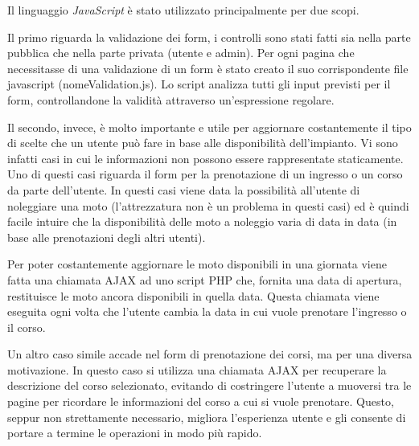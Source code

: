 Il linguaggio \textit{JavaScript} è stato utilizzato principalmente per due scopi.

Il primo riguarda la validazione dei form, i controlli sono stati fatti sia nella parte pubblica che nella parte privata (utente e admin). Per ogni pagina che necessitasse di una validazione di un form è stato creato il suo corrispondente file javascript (nomeValidation.js). Lo script analizza tutti gli input previsti per il form, controllandone la validità attraverso un'espressione regolare.
    
Il secondo, invece, è molto importante e utile per aggiornare costantemente il tipo di scelte che un utente può fare in base alle disponibilità dell'impianto. Vi sono infatti casi in cui le informazioni non possono essere rappresentate staticamente. Uno di questi casi riguarda il form per la prenotazione di un ingresso o un corso da parte dell'utente. In questi casi viene data la possibilità all'utente di noleggiare una moto (l'attrezzatura non è un problema in questi casi) ed è quindi facile intuire che la disponibilità delle moto a noleggio varia di data in data (in base alle prenotazioni degli altri utenti).

Per poter costantemente aggiornare le moto disponibili in una giornata viene fatta una chiamata AJAX ad uno script PHP che, fornita una data di apertura, restituisce le moto ancora disponibili in quella data. Questa chiamata viene eseguita ogni volta che l'utente cambia la data in cui vuole prenotare l'ingresso o il corso.

Un altro caso simile accade nel form di prenotazione dei corsi, ma per una diversa motivazione. In questo caso si utilizza una chiamata AJAX per recuperare la descrizione del corso selezionato, evitando di costringere l'utente a muoversi tra le pagine per ricordare le informazioni del corso a cui si vuole prenotare. Questo, seppur non strettamente necessario, migliora l'esperienza utente e gli consente di portare a termine le operazioni in modo più rapido.
 